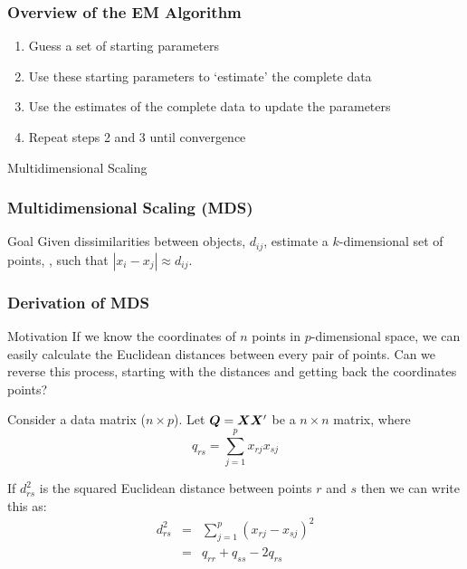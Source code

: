 \documentclass{beamer}
\begin{document}
\begin{frame}
  \frametitle{Overview of the EM Algorithm}

\begin{enumerate}
    \item Guess a set of starting parameters
    \item Use these starting parameters to `estimate' the complete data
    \item Use the estimates of the complete data to update the parameters
    \item Repeat steps 2 and 3 until convergence
\end{enumerate}

\end{frame}


\begin{frame}[plain,c]
\begin{center}
\Huge Multidimensional Scaling
\end{center}
\end{frame}



\begin{frame}
  \frametitle{Multidimensional Scaling (MDS)}

\begin{block}{Goal}
Given dissimilarities between objects, $d_{ij}$, estimate a $k$-dimensional set of points, , such that $|x_i - x_j| \approx d_{ij}$.
\end{block}


\end{frame}

\begin{frame}[shrink=5]
\frametitle{Derivation of MDS}

\begin{block}{Motivation}
    If we know the coordinates of $n$ points in $p$-dimensional space, we can easily calculate the Euclidean distances between every pair of points. \alert{Can we reverse this process, starting with the distances and getting back the coordinates points?}
\end{block}

Consider a data matrix  ($n \times p$).  Let  $\bm{Q} = \bm{X}\bm{X}'$ be a $n \times n$ matrix, where
\[
q_{rs} = \sum_{j=1}^p x_{rj}x_{sj}
\]

If $d_{rs}^2$ is the squared Euclidean distance between points $r$ and $s$ then we can write this as:
\begin{eqnarray*}
d_{rs}^2 &=& \sum_{j=1}^p (x_{rj}-x_{sj})^2 \\
         &=& q_{rr} + q_{ss} - 2q_{rs}
\end{eqnarray*}

\end{frame}
\end{document}
